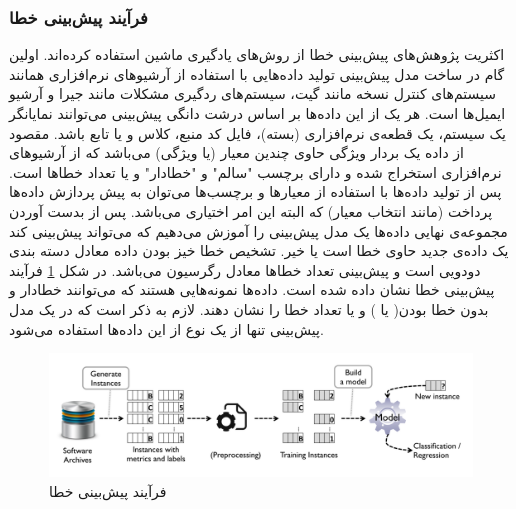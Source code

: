 \subsubsection{فرآیند پیش‌بینی خطا}
اکثریت پژوهش‌های پیش‌بینی خطا از روش‌های یادگیری ماشین  استفاده کرده‌اند. اولین گام در ساخت مدل پیش‌بینی تولید داده‌هایی با استفاده از آرشیو‌های نرم‌افزاری همانند سیستم‌های کنترل نسخه مانند گیت، سیستم‌های ردگیری مشکلات  مانند جیرا و آرشیو ایمیل‌ها است. هر یک از این داده‌ها بر اساس درشت دانگی پیش‌بینی می‌توانند نمایانگر یک سیستم، یک قطعه‌ی نرم‌افزاری (بسته)، فایل کد منبع، کلاس و یا تابع باشد. مقصود از داده یک بردار ویژگی حاوی چندین معیار (یا ویژگی) می‌باشد که از آرشیو‌های نرم‌افزاری استخراج شده و دارای برچسب "سالم" و "خطادار"  و یا تعداد خطاها است. پس از تولید داده‌ها با استفاده از معیارها و برچسب‌ها می‌توان به پیش پردازش داده‌ها پرداخت (مانند انتخاب معیار) که البته این امر اختیاری می‌باشد. پس از بدست آوردن مجموعه‌ی نهایی داده‌ها یک مدل پیش‌بینی را آموزش می‌دهیم که می‌تواند پیش‌بینی کند یک داده‌ی جدید حاوی خطا است یا خیر. تشخیص خطا خیز بودن داده معادل دسته بندی دودویی است و پیش‌بینی تعداد خطاها معادل رگرسیون می‌باشد. در شکل \ref{fig:prediction-process} فرآیند پیش‌بینی خطا نشان داده شده است. داده‌ها نمونه‌هایی هستند که می‌توانند خطادار  و بدون  خطا  بودن(    یا    ) و یا تعداد خطا را نشان دهند. لازم به ذکر است که در یک مدل پیش‌بینی تنها از یک نوع از این داده‌ها استفاده می‌شود.

\begin{figure}[H]
	\centering
	\includegraphics[width=1.0\textwidth]{images/prediction-process.PNG}
	 \caption{فرآیند پیش‌بینی خطا \cite{nam2014survey}}
	\label{fig:prediction-process}
\end{figure}